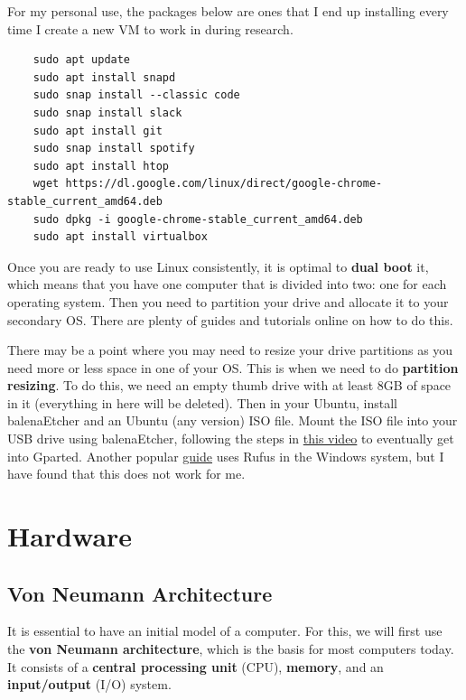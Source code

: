 \documentclass{article}
\begin{document}
  For my personal use, the packages below are ones that I end up installing every time I create a new VM to work in during research. 

  \begin{lstlisting}
    sudo apt update
    sudo apt install snapd
    sudo snap install --classic code
    sudo snap install slack
    sudo apt install git 
    sudo snap install spotify 
    sudo apt install htop
    wget https://dl.google.com/linux/direct/google-chrome-stable_current_amd64.deb
    sudo dpkg -i google-chrome-stable_current_amd64.deb
    sudo apt install virtualbox 
  \end{lstlisting}

  Once you are ready to use Linux consistently, it is optimal to \textbf{dual boot} it, which means that you have one computer that is divided into two: one for each operating system. Then you need to partition your drive and allocate it to your secondary OS. There are plenty of guides and tutorials online on how to do this. 

  There may be a point where you may need to resize your drive partitions as you need more or less space in one of your OS. This is when we need to do \textbf{partition resizing}. To do this, we need an empty thumb drive with at least 8GB of space in it (everything in here will be deleted). Then in your Ubuntu, install balenaEtcher and an Ubuntu (any version) ISO file. Mount the ISO file into your USB drive using balenaEtcher, following the steps in \href{https://www.youtube.com/watch?v=Kyz9x71gEPI&t=504s}{this video} to eventually get into Gparted. Another popular \href{https://www.youtube.com/watch?v=vlVXPtJ20hA&t=467s}{guide} uses Rufus in the Windows system, but I have found that this does not work for me. 
 
\section{Hardware} 

  \subsection{Von Neumann Architecture}

    It is essential to have an initial model of a computer. For this, we will first use the \textbf{von Neumann architecture}, which is the basis for most computers today. It consists of a \textbf{central processing unit} (CPU), \textbf{memory}, and an \textbf{input/output} (I/O) system.
\end{document}
